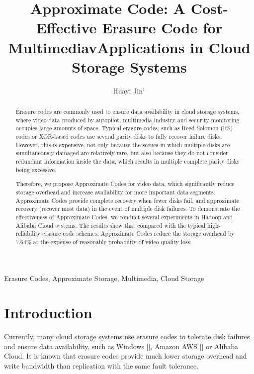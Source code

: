 \documentclass[sigconf]{acmart}
\begin{document}
\title{\LARGE{Approximate Code: A Cost-Effective Erasure Code for MultimediavApplications in Cloud Storage Systems}\\
}
\author{Huayi Jin$^1$}


\maketitle

\begin{abstract}
Erasure codes are commonly used to ensure data availability in cloud storage systems, where video data produced by autopilot, multimedia industry and security monitoring occupies large amounts of space. 
Typical erasure codes, such as Reed-Solomon (RS) \cite{macwilliams1977theory} codes or XOR-based codes use several parity disks to fully recover failure disks. 
However, this is expensive, not only because the scenes in which multiple disks are simultaneously damaged are relatively rare, but also because they do not consider redundant information inside the data, which results in multiple complete parity disks being excessive.   
   

Therefore, we propose Approximate Codes for video data, which significantly reduce storage overhead and increase availability for more important data segments.
Approximate Codes provide complete recovery when fewer disks fail, and approximate recovery (recover most data) in the event of multiple disk failures.
To demonstrate the effectiveness of Approximate Codes, we conduct several experiments in Hadoop and Alibaba Cloud systems.
The results show that compared with the typical high-reliability erasure code schemes, Approximate Codes reduce the storage overhead by 7.64\% at the expense of reasonable probability of video quality loss.

\end{abstract}

\begin{keywords}
    Erasure Codes, Approximate Storage, Multimedia, Cloud Storage
\end{keywords}

\section{Introduction}
Currently, many cloud storage systems use erasure codes to tolerate disk failures and ensure data availability, such as Windows [], Amazon AWS [] or Alibaba Cloud. It is known that erasure codes provide much lower storage overhead and write bandwidth than replication with the same fault tolerance.
\end{document}
